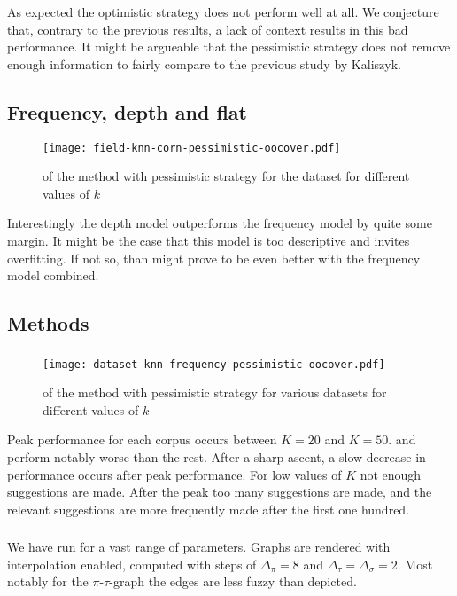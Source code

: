 As expected the optimistic strategy does not perform well at all.
We conjecture that, contrary to the previous results, a lack of context results in this bad performance.
It might be argueable that the pessimistic strategy does not remove enough information to fairly compare to the previous study by
Kaliszyk. \cite{kaliszyk2014machine}

\subsection{Frequency, depth and flat}
\begin{figure}[H]
  \centering
  \texttt{[image: field-knn-corn-pessimistic-oocover.pdf]}
  \caption{\oocover of the \knn method with pessimistic strategy for the \corn dataset for different values of $k$}
\end{figure}

Interestingly the depth model outperforms the frequency model by quite some margin.
It might be the case that this model is too descriptive and invites overfitting.
If not so, than might prove to be even better with the frequency model combined.

\subsection{Methods}

\subsubsection{\knn}
\begin{figure}[H]
  \centering
  \texttt{[image: dataset-knn-frequency-pessimistic-oocover.pdf]}
  \caption{\oocover of the \knn method with pessimistic strategy for various datasets for different values of $k$}
\end{figure}

Peak \oocover performance for each corpus occurs between $K=20$ and $K=50$.
\corn and \mathclasses perform notably worse than the rest.
After a sharp ascent, a slow decrease in performance occurs after peak performance.
For low values of $K$ not enough suggestions are made.
After the peak too many suggestions are made, and the relevant suggestions are more frequently made after the first one hundred.

\subsubsection{\nb}
We have run \nb for a vast range of parameters.
Graphs are rendered with interpolation enabled, computed with steps of $\Delta_\pi = 8$ and $\Delta_\tau = \Delta_\sigma = 2$.
Most notably for the $\pi$-$\tau$-graph the edges are less fuzzy than depicted.

